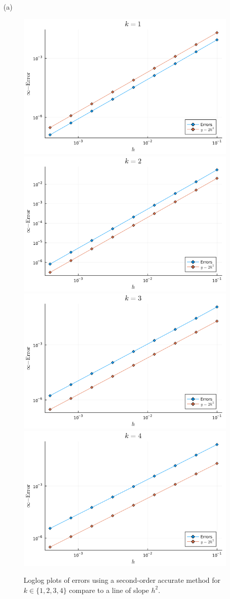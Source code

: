 \documentclass[12pt]{report}
\begin{document}
\begin{solution}

    \noindent
    \begin{enumerate}
      \item [(a)]
      
      \begin{figure}[h!]
        \centering
        \includegraphics[width=0.48\linewidth]{images/1a1.png}
        \includegraphics[width=0.48\linewidth]{images/2a1.png}
        \includegraphics[width=0.48\linewidth]{images/3a1.png}
        \includegraphics[width=0.48\linewidth]{images/4a1.png}
        \caption{Loglog plots of errors using a second-order accurate method for $k \in \{1,2,3,4\}$ compare to a line of slope $h^2$.}
      \end{figure}


\end{enumerate}
\end{solution}
\end{document}
